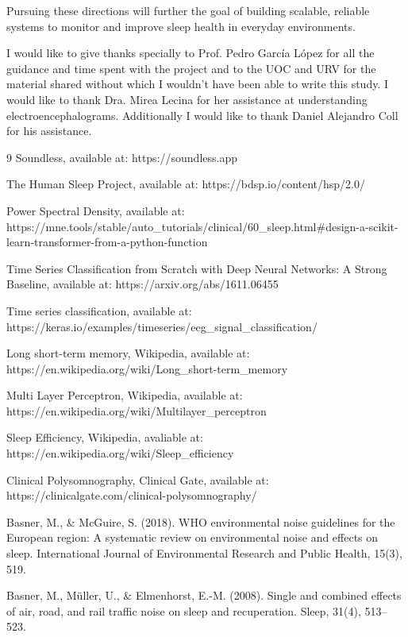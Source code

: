 Pursuing these directions will further the goal of building scalable, reliable systems to monitor and improve sleep health in everyday environments.

I would like to give thanks specially to Prof. Pedro Garc\'ia L\'opez for all the guidance and time spent with the project and to the UOC and URV for the material shared without which I wouldn't have been able to write this study. I would like to thank Dra. Mirea Lecina for her assistance at understanding electroencephalograms. Additionally I would like to thank Daniel Alejandro Coll for his assistance.


\begin{thebibliography}{9}
Soundless, available at: https://soundless.app

The Human Sleep Project, available at: https://bdsp.io/content/hsp/2.0/

Power Spectral Density, available at: https://mne.tools/stable/auto\_tutorials/clinical/60\_sleep.html\#design-a-scikit-learn-transformer-from-a-python-function

Time Series Classification from Scratch with Deep Neural Networks: A Strong Baseline, available at: https://arxiv.org/abs/1611.06455

Time series classification, available at: https://keras.io/examples/timeseries/eeg\_signal\_classification/

Long short-term memory, Wikipedia, available at: https://en.wikipedia.org/wiki/Long\_short-term\_memory

Multi Layer Perceptron, Wikipedia, available at: https://en.wikipedia.org/wiki/Multilayer\_perceptron

Sleep Efficiency, Wikipedia, avaliable at: https://en.wikipedia.org/wiki/Sleep\_efficiency

Clinical Polysomnography, Clinical Gate, available at: https://clinicalgate.com/clinical-polysomnography/

Basner, M., \& McGuire, S. (2018). WHO environmental noise guidelines for the European region: A systematic review on environmental noise and effects on sleep. International Journal of Environmental Research and Public Health, 15(3), 519.

Basner, M., Müller, U., \& Elmenhorst, E.-M. (2008). Single and combined effects of air, road, and rail traffic noise on sleep and recuperation. Sleep, 31(4), 513–523.


\end{thebibliography}

